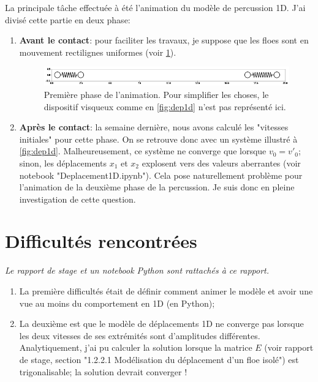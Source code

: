 \documentclass[
  french,
	11pt, %
]{fphw}
\begin{document}
La principale tâche effectuée à été l'animation du modèle de percussion 1D. J'ai divisé cette partie en deux phase:
\begin{enumerate}
    \item \textbf{Avant le contact}: pour faciliter les travaux, je suppose que les floes sont en mouvement rectilignes uniformes (voir \cref{fig:anim1}).
    \begin{figure}[H]
      \centering
      \includegraphics[width=.99\textwidth]{Animation1D.png}
      \caption{Première phase de l'animation. Pour simplifier les choses, le dispositif visqueux comme en \cref{fig:dep1d} n'est pas représenté ici. }
      \label{fig:anim1}
    \end{figure}
    \item \textbf{Après le contact}: la semaine dernière, nous avons calculé les "vitesses initiales" pour cette phase. On se retrouve donc avec un système illustré à \cref{fig:dep1d}. Malheureusement, ce système ne converge que lorsque $v_0 = v'_0$; sinon, les déplacements $x_1$ et $x_2$ explosent vers des valeurs aberrantes (voir notebook "Deplacement1D.ipynb"). Cela pose naturellement problème pour l'animation de la deuxième phase de la percussion. Je suis donc en pleine investigation de cette question.
\end{enumerate}



\section*{Difficultés rencontrées}

\textit{Le rapport de stage et un notebook Python sont rattachés à ce rapport.}

\begin{enumerate}
  \item La première difficultés était de définir comment animer le modèle et avoir une vue au moins du comportement en 1D (en Python);
  \item La deuxième est que le modèle de déplacements 1D ne converge pas lorsque les deux vitesses de ses extrémités sont d'amplitudes différentes. Analytiquement, j'ai pu calculer la solution lorsque la matrice $E$ (voir rapport de stage, section "1.2.2.1 Modélisation du déplacement d’un floe isolé") est trigonalisable; la solution devrait converger !
\end{enumerate}
\end{document}
